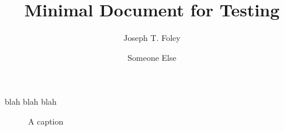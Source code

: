 \documentclass{memoir}
\title{Minimal Document for Testing}
\author{Joseph T. Foley \and Someone Else}
\begin{document}
\maketitle
blah blah blah
\begin{figure}
  \centering
  \caption{A caption}
\end{figure}
\end{document}
